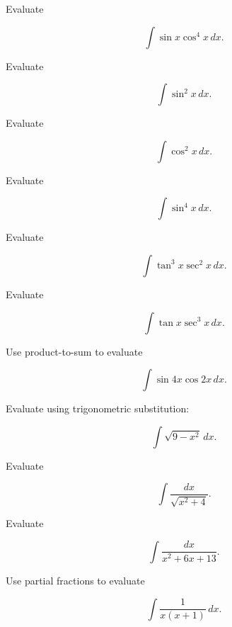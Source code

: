 \begin{exercise}[2]
Evaluate

\[
\int\sin x\cos^4x\,dx.
\]
\end{exercise}

\begin{exercise}[2]
Evaluate

\[
\int\sin^2x\,dx.
\]
\end{exercise}

\begin{exercise}[2]
Evaluate

\[
\int\cos^2x\,dx.
\]
\end{exercise}

\begin{exercise}[3]
Evaluate

\[
\int\sin^4x\,dx.
\]
\end{exercise}

\begin{exercise}[3]
Evaluate

\[
\int\tan^3x\sec^2x\,dx.
\]
\end{exercise}

\begin{exercise}[3]
Evaluate

\[
\int\tan x\sec^3x\,dx.
\]
\end{exercise}

\begin{exercise}[2]
Use product-to-sum to evaluate

\[
\int
\sin4x\cos2x
\,dx.
\]
\end{exercise}

\begin{exercise}[3]
Evaluate using trigonometric substitution:

\[
\int
\sqrt{9-x^2}
\,dx.
\]
\end{exercise}

\begin{exercise}[3]
Evaluate

\[
\int
\frac{
dx
}{
\sqrt{x^2+4}
}.
\]
\end{exercise}

\begin{exercise}[3]
Evaluate

\[
\int
\frac{
dx
}{
x^2+6x+13
}.
\]
\end{exercise}

\begin{exercise}[2]
Use partial fractions to evaluate

\[
\int
\frac{
1
}{
x(x+1)
}
\,dx.
\]
\end{exercise}

